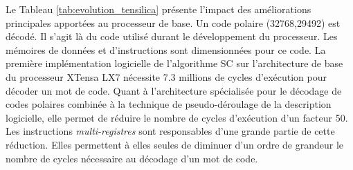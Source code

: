 Le Tableau \ref{tab:evolution_tensilica} présente l'impact des améliorations principales apportées au processeur de base. Un code polaire (32768,29492) est décodé. Il s'agit là du code utilisé durant le développement du processeur. Les mémoires de données et d'instructions sont dimensionnées pour ce code. La première implémentation logicielle de l'algorithme SC sur l'architecture de base du processeur XTensa LX7 nécessite 7.3 millions de cycles d'exécution pour décoder un mot de code. Quant à l'architecture spécialisée pour le décodage de codes polaires combinée à la technique de pseudo-déroulage de la description logicielle, elle permet de réduire le nombre de cycles d'exécution d'un facteur 50. Les instructions \textit{multi-registres} sont responsables d'une grande partie de cette réduction. Elles permettent à elles seules de diminuer d'un ordre de grandeur le nombre de cycles nécessaire au décodage d'un mot de code.
 \begin{table}[htp]
    \renewcommand{\arraystretch}{1.1}
    \centering
    \caption{Impact de chaque amélioration de l'ASIP sur le nombre de cycles d'horloges nécessaires pour décoder une trame, le débit et la surface occupée. La taille des mémoires n'est pas prise en compte pour la surface occupée. Fréquence considérée : 835 MHz.}
    \label{tab:evolution_tensilica}
    {\small{}}
  \end{table}


